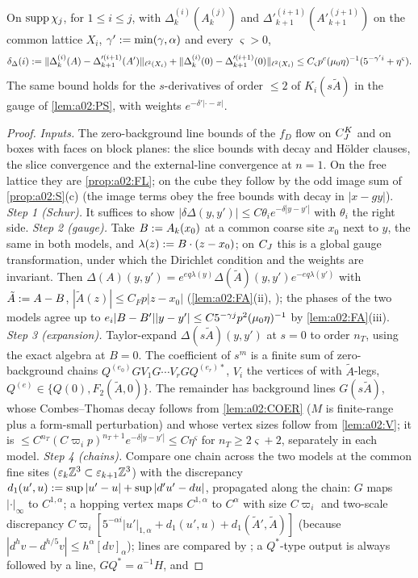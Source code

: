 \begin{proposition}\label{prop:a02:DCONV}
On $\operatorname{supp}\chi_j$, for $1\le i\le j$, with $\Delta^{(i)}_k(A^{(j)}_k)$ and $\Delta'^{(i+1)}_{k+1}(A'^{(j+1)}_{k+1})$ on the common lattice $X_i$, $\gamma':=\min(\gamma,\alpha)$ and every $\varsigma>0$,
\[
\delta_\Delta(i):=\lVert \Delta^{(i)}_k(A)-\Delta'^{(i+1)}_{k+1}(A')\rVert_{\ell^2(X_i)}+\lVert \Delta^{(i)}_k(0)-\Delta'^{(i+1)}_{k+1}(0)\rVert_{\ell^2(X_i)}\le C_\varsigma p^c(\mu_0\eta)^{-1}(5^{-\gamma'i}+\eta^\varsigma).
\]
The same bound holds for the $s$-derivatives of order $\le2$ of $K_i(s\tilde A)$ in the gauge of \cref{lem:a02:PS}, with weights $e^{-\delta'|\cdot-x|}$.
\end{proposition}
\begin{proof}
\emph{Inputs.} The zero-background line bounds of the $f_D$ flow on $C^{K}_{J}$ and on boxes with faces on block planes: the slice bounds \cite[(3.63)--(3.65)]{K1} with decay and H\"older clauses, the slice convergence \cite[(3.73)--(3.75)]{K1} and the external-line convergence \cite[(3.71), (3.74)]{K1} at $n=1$. On the free lattice they are \cref{prop:a02:FL}; on the cube they follow by the odd image sum of \cref{prop:a02:S}(c) (the image terms obey the free bounds with decay in $|x-gy|$). \emph{Step 1 (Schur).} It suffices to show $|\delta\Delta(y,y')|\le C\theta_ie^{-\delta|y-y'|}$ with $\theta_i$ the right side. \emph{Step 2 (gauge).} Take $B:= A_k(x_0)$ at a common coarse site $x_0$ next to $y$, the same in both models, and $\lambda(z):= B\cdot(z-x_0)$; on $C_J$ this is a global gauge transformation, under which the Dirichlet condition and the weights are invariant. Then $\Delta(A)(y,y')=e^{eq\lambda(y)}\Delta(\tilde A)(y,y')e^{-eq\lambda(y')}$ with $\tilde A:= A-B$, $|\tilde A(z)|\le C_Fp|z-x_0|$ (\cref{lem:a02:FA}(ii), \cite[(3.45)]{K1}); the phases of the two models agree up to $e_i|B-B'||y-y'|\le C5^{-\gamma j}p^2(\mu_0\eta)^{-1}$ by \cref{lem:a02:FA}(iii). \emph{Step 3 (expansion).} Taylor-expand $\Delta(s\tilde A)(y,y')$ at $s=0$ to order $n_T$, using the exact algebra \cite[(3.47)--(3.53)]{K1} at $B=0$. The coefficient of $s^m$ is a finite sum of zero-background chains $Q^{(e_0)}GV_1G\cdots V_rGQ^{(e_r)*}$, $V_i$ the vertices of \cite[(3.53)]{K1} with $\tilde A$-legs, $Q^{(e)}\in\{Q(0),F_2(\tilde A,0)\}$. The remainder has background lines $G(s\tilde A)$, whose Combes--Thomas decay follows from \cref{lem:a02:COER} ($M$ is finite-range plus a form-small perturbation) and whose vertex sizes follow from \cref{lem:a02:V}; it is $\le C^{n_T}(C\varpi_ip)^{n_T+1}e^{-\delta|y-y'|}\le C\eta^\varsigma$ for $n_T\ge2\varsigma+2$, separately in each model. \emph{Step 4 (chains).} Compare one chain across the two models at the common fine sites ($\varepsilon_k\mathbb Z^3\subset\varepsilon_{k+1}\mathbb Z^3$) with the discrepancy $d_1(u',u):=\sup|u'-u|+\sup|d'u'-du|$, propagated along the chain: $G$ maps $|\cdot|_\infty$ to $C^{1,\alpha}$; a hopping vertex maps $C^{1,\alpha}$ to $C^\alpha$ with size $C\varpi_i$ and two-scale discrepancy $C\varpi_i[5^{-\alpha i}|u'|_{1,\alpha}+d_1(u',u)+d_1(\tilde A',\tilde A)]$ (because $|d^hv-d^{h/5}v|\le h^\alpha[dv]_\alpha$); lines are compared by \cite[(3.73)--(3.75)]{K1}; a $Q^*$-type output is always followed by a line, $GQ^*=a^{-1}H$, and 
\end{proof}
